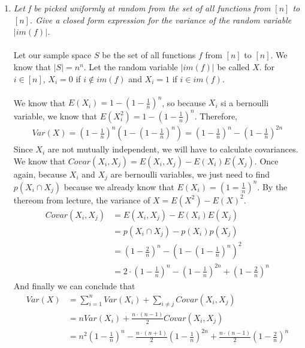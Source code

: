 \documentclass[a4paper]{article}
\begin{document}
\begin{enumerate}
\item \emph{Let f be picked uniformly at random from the set of all functions from $[n]$ to $[n]$. Give a closed form expression for the variance of the random variable $|im(f)|$.} \\
\\
Let our sample space $S$ be the set of all functions $f$ from $[n]$ to $[n]$. We know that $|S| = n^n$. Let the random variable $|im(f)|$ be called $X$. for $i \in [n]$, $X_i = 0$ if $i \notin im(f)$ and $X_i = 1$ if $i \in im(f)$. \\
\\
We know that $E(X_i) = 1 - (1- \frac{1}{n})^n$, so because $X_i$ si a bernoulli variable, we know that $E(X_i^2) =  1 - (1- \frac{1}{n})^n$. Therefore, 
\begin{align*}
Var(X) = \left(1-\frac{1}{n}\right)^n \left(1-\left(1- \frac{1}{n}\right)^n\right) = \left(1- \frac{1}{n}\right)^n - \left(1- \frac{1}{n}\right)^{2n}
\end{align*}
Since $X_i$ are not mutually independent, we will have to calculate covariances. We know that $Covar(X_i,X_j) = E(X_i,X_j) -E(X_i)E(X_j)$. Once again, because $X_i$ and $X_j$ are bernoulli variables, we just need to find $p(X_i \cap X_j)$ because we already know that $E(X_i) = (1 = \frac{1}{n})^n$. By the thereom from lecture, the variance of $X = E(X^2) - E(X)^2$.
\begin{align*}
Covar(X_i,X_j) &= E(X_i,X_j) -E(X_i)E(X_j) \\
&= p(X_i \cap X_j) - p(X_i)p(X_j) \\
&= \left(1- \frac{2}{n}\right)^n - \left(1 - \left(1- \frac{1}{n}\right)^n \right)^2  \\
&= 2 \cdot \left(1- \frac{1}{n}\right)^n - \left(1- \frac{1}{n}\right)^{2n} + \left(1- \frac{2}{n}\right)^n
\end{align*}
And finally we can conclude that 
\begin{align*}
Var(X) &= \sum\limits_{i = 1}^{n}Var(X_i) + \sum\limits_{i \neq j}Covar(X_i,X_j) \\
&= nVar(X_i) + \frac{n\cdot(n-1)}{2} Covar(X_i,X_j) \\
&= n^2 \left(1- \frac{1}{n}\right)^n- \frac{n\cdot(n+1)}{2}\left(1- \frac{1}{n}\right)^{2n} + \frac{n\cdot(n-1)}{2}\left(1- \frac{2}{n}\right)^n \\
\end{align*}




\end{enumerate}
\end{document}
